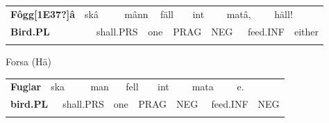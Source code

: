 \begin{tabular}{llllllllllllll}
\lsptoprule
{\bfseries Fôgg[1E37?]â} & \multicolumn{2}{l}{skâ

} & \multicolumn{2}{l}{mânn

} & \multicolumn{2}{l}{fäll

} & \multicolumn{2}{l}{int

} & \multicolumn{2}{l}{matâ,

} & \multicolumn{2}{l}{häll!

} & \\
\multicolumn{2}{l}{{\bfseries Bird.PL}

} & \multicolumn{2}{l}{shall.PRS

} & \multicolumn{2}{l}{one

} & \multicolumn{2}{l}{PRAG

} & \multicolumn{2}{l}{NEG

} & \multicolumn{2}{l}{feed.INF

} & \multicolumn{2}{l}{either

}\\
\lspbottomrule
\end{tabular}

\begin{styleExLtrTblii}
Forsa (Hä)

\end{styleExLtrTblii}

\begin{tabular}{llllllllllllll}
\lsptoprule
\textbf{Fug}l\textbf{ar} & \multicolumn{2}{l}{ska

} & \multicolumn{2}{l}{man

} & \multicolumn{2}{l}{fell

} & \multicolumn{2}{l}{int

} & \multicolumn{2}{l}{mata

} & \multicolumn{2}{l}{e.

} & \\
\multicolumn{2}{l}{\footnotemark{}\textbf{bird.PL}

} & \multicolumn{2}{l}{shall.PRS

} & \multicolumn{2}{l}{one

} & \multicolumn{2}{l}{PRAG

} & \multicolumn{2}{l}{NEG

} & \multicolumn{2}{l}{feed.INF

} & \multicolumn{2}{l}{NEG

}\\
\lspbottomrule
\end{tabular}


